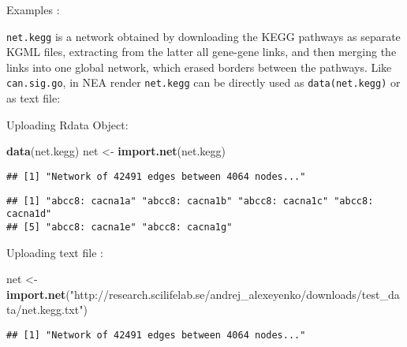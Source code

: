 \documentclass[]{article}
\newenvironment{Shaded}{\begin{snugshade}}{\end{snugshade}}
\newcommand{\KeywordTok}[1]{\textcolor[rgb]{0.13,0.29,0.53}{\textbf{#1}}}
\newcommand{\DataTypeTok}[1]{\textcolor[rgb]{0.13,0.29,0.53}{#1}}
\newcommand{\DecValTok}[1]{\textcolor[rgb]{0.00,0.00,0.81}{#1}}
\newcommand{\StringTok}[1]{\textcolor[rgb]{0.31,0.60,0.02}{#1}}
\newcommand{\OperatorTok}[1]{\textcolor[rgb]{0.81,0.36,0.00}{\textbf{#1}}}
\newcommand{\NormalTok}[1]{#1}
\begin{document}
Examples :

\texttt{net.kegg} is a network obtained by downloading the KEGG pathways
as separate KGML files, extracting from the latter all gene-gene links,
and then merging the links into one global network, which erased borders
between the pathways. Like \texttt{can.sig.go}, in NEA render
\texttt{net.kegg} can be directly used as \texttt{data(net.kegg)} or as
text file:

Uploading Rdata Object:

\begin{Shaded}
\begin{Highlighting}[]
\KeywordTok{data}\NormalTok{(net.kegg)}
\NormalTok{net <-}\StringTok{ }\KeywordTok{import.net}\NormalTok{(net.kegg)}
\end{Highlighting}
\end{Shaded}

\begin{verbatim}
## [1] "Network of 42491 edges between 4064 nodes..."
\end{verbatim}

\begin{Shaded}
\end{Shaded}

\begin{verbatim}
## [1] "abcc8: cacna1a" "abcc8: cacna1b" "abcc8: cacna1c" "abcc8: cacna1d"
## [5] "abcc8: cacna1e" "abcc8: cacna1g"
\end{verbatim}

Uploading text file :

\begin{Shaded}
\begin{Highlighting}[]
\NormalTok{net <-}\StringTok{ }\KeywordTok{import.net}\NormalTok{(}\StringTok{"http://research.scilifelab.se/andrej_alexeyenko/downloads/test_data/net.kegg.txt"}\NormalTok{)}
\end{Highlighting}
\end{Shaded}

\begin{verbatim}
## [1] "Network of 42491 edges between 4064 nodes..."
\end{verbatim}
\end{document}
